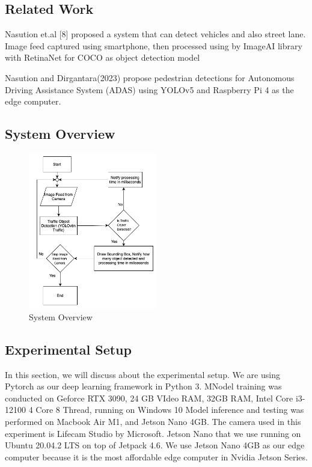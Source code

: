 \documentclass[conference]{IEEEtran}
\begin{document}
\subsection{Related Work}
Nasution et.al [8] proposed a system that can detect vehicles and also street lane. Image feed captured using smartphone, then processed using by ImageAI library with RetinaNet for COCO as object detection model

Nasution and Dirgantara(2023) propose pedestrian detections for Autonomous Driving Assistance System (ADAS) using YOLOv5 and Raspberry Pi 4 as the edge computer.
\subsection{System Overview}
\begin{figure}
\centering
\includegraphics[width=0.5\textwidth,keepaspectratio]{Proposed Flowchart.png}
\caption{System Overview}
\end{figure}

\subsection{Experimental Setup}
In this section, we will discuss about the experimental setup. We are using Pytorch as our deep learning framework in Python  3.
MNodel training was conducted on Geforce RTX 3090, 24 GB VIdeo RAM, 32GB RAM, Intel Core i3-12100 4 Core 8 Thread, running on Windows 10
Model inference and testing was performed on Macbook Air M1, and Jetson Nano 4GB. The camera used in this experiment is Lifecam Studio by Microsoft.
Jetson Nano that we use running on Ubuntu 20.04.2 LTS on top of Jetpack 4.6. We use Jetson Nano 4GB as our edge computer because it is the most affordable edge computer in Nvidia Jetson Series.
\end{document}
